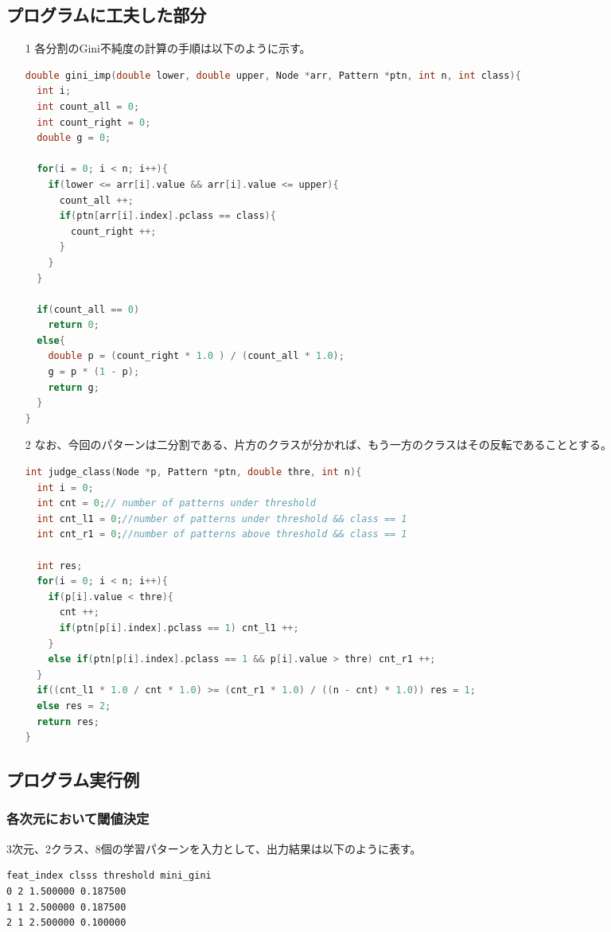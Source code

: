 \documentclass[ %
  uplatex,%
  papersize%
]{jsarticle}
\begin{document}
\subsection{プログラムに工夫した部分}
\begin{itemize}
\item[1] 各分割のGini不純度の計算の手順は以下のように示す。

\begin{lstlisting}[language=c,caption=Gini impurity]
  double gini_imp(double lower, double upper, Node *arr, Pattern *ptn, int n, int class){
  int i;
  int count_all = 0;
  int count_right = 0;
  double g = 0;

  for(i = 0; i < n; i++){
    if(lower <= arr[i].value && arr[i].value <= upper){
      count_all ++;
      if(ptn[arr[i].index].pclass == class){
        count_right ++;
      }
    }
  }
  
  if(count_all == 0)
    return 0;
  else{
    double p = (count_right * 1.0 ) / (count_all * 1.0);
    g = p * (1 - p);
    return g;
  }
}\end{lstlisting}

\item[2] なお、今回のパターンは二分割である、片方のクラスが分かれば、もう一方のクラスはその反転であることとする。
\begin{lstlisting}[language=c,caption=Judge Class under Threshold]
int judge_class(Node *p, Pattern *ptn, double thre, int n){
  int i = 0;
  int cnt = 0;// number of patterns under threshold
  int cnt_l1 = 0;//number of patterns under threshold && class == 1
  int cnt_r1 = 0;//number of patterns above threshold && class == 1

  int res;
  for(i = 0; i < n; i++){
    if(p[i].value < thre){
      cnt ++;
      if(ptn[p[i].index].pclass == 1) cnt_l1 ++;
    }
    else if(ptn[p[i].index].pclass == 1 && p[i].value > thre) cnt_r1 ++;
  }
  if((cnt_l1 * 1.0 / cnt * 1.0) >= (cnt_r1 * 1.0) / ((n - cnt) * 1.0)) res = 1;
  else res = 2;
  return res;
}\end{lstlisting}
\end{itemize}

\subsection{プログラム実行例}
\subsubsection{各次元において閾値決定}
3次元、2クラス、8個の学習パターンを入力として、出力結果は以下のように表す。
\begin{lstlisting}[language=bash,caption=Recognition]
feat_index clsss threshold mini_gini
0 2 1.500000 0.187500
1 1 2.500000 0.187500
2 1 2.500000 0.100000
\end{lstlisting}
\end{document}
